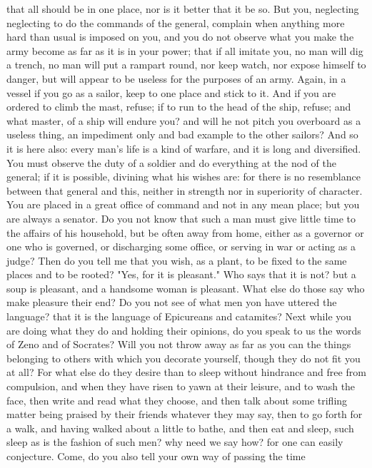 \documentclass[a4paper]{article}
\begin{document}
that all should be in one place, nor is it better that it be so. But you,
neglecting neglecting to do the commands of the general, complain when anything
more hard than usual is imposed on you, and you do not observe what you make
the army become as far as it is in your power; that if all imitate you, no man
will dig a trench, no man will put a rampart round, nor keep watch, nor expose
himself to danger, but will appear to be useless for the purposes of an army.
Again, in a vessel if you go as a sailor, keep to one place and stick to it.
And if you are ordered to climb the mast, refuse; if to run to the head of the
ship, refuse; and what master, of a ship will endure you? and will he not pitch
you overboard as a useless thing, an impediment only and bad example to the
other sailors? And so it is here also: every man's life is a kind of warfare,
and it is long and diversified. You must observe the duty of a soldier and do
everything at the nod of the general; if it is possible, divining what his
wishes are: for there is no resemblance between that general and this, neither
in strength nor in superiority of character. You are placed in a great office
of command and not in any mean place; but you are always a senator. Do you not
know that such a man must give little time to the affairs of his household, but
be often away from home, either as a governor or one who is governed, or
discharging some office, or serving in war or acting as a judge? Then do you
tell me that you wish, as a plant, to be fixed to the same places and to be
rooted? "Yes, for it is pleasant." Who says that it is not? but a soup is
pleasant, and a handsome woman is pleasant. What else do those say who make
pleasure their end? Do you not see of what men yon have uttered the language?
that it is the language of Epicureans and catamites? Next while you are doing
what they do and holding their opinions, do you speak to us the words of Zeno
and of Socrates? Will you not throw away as far as you can the things belonging
to others with which you decorate yourself, though they do not fit you at all?
For what else do they desire than to sleep without hindrance and free from
compulsion, and when they have risen to yawn at their leisure, and to wash the
face, then write and read what they choose, and then talk about some trifling
matter being praised by their friends whatever they may say, then to go forth
for a walk, and having walked about a little to bathe, and then eat and sleep,
such sleep as is the fashion of such men? why need we say how? for one can
easily conjecture. Come, do you also tell your own way of passing the time
\end{document}
